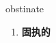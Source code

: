
\begin{frame}
{\huge obstinate}
\begin{center}
\begin{enumerate}\Large
  \item \textbf{固执的}
\end{enumerate}
\end{center}
\end{frame}
